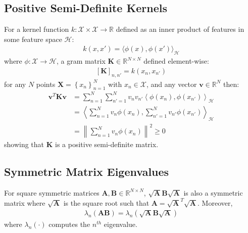 \documentclass{article}
\numberwithin{equation}{section}
\begin{document}
\subsection{Positive Semi-Definite Kernels} \label{appendix:positive-definite-kernel}
For a kernel function $k: \mathcal{X} \times \mathcal{X} \rightarrow \mathbb{R}$ defined as an inner product of features in some feature space $\mathcal{H}$:
\begin{align}
    k(x, x') = \langle \phi(x), \phi(x') \rangle_{\mathcal{H}}
\end{align}
where $\phi: \mathcal{X} \rightarrow \mathcal{H}$, a gram matrix $\mathbf{K} \in \mathbb{R}^{N\times N}$ defined element-wise:
\begin{align}
    \left[\mathbf{K}\right]_{n, n'} = k(x_n, x_{n'})
\end{align}
for any $N$ points $\mathbf{X} = \left\{x_n\right\}_{n=1}^N$ with $x_n \in \mathcal{X}$, and any vector $\mathbf{v} \in \mathbb{R}^N$ then:
\begin{align}
    \mathbf{v}^T \mathbf{K} \mathbf{v} &= \sum_{n=1}^N\sum_{n'=1}^N v_n v_{n'}  \left\langle \phi(x_n), \phi(x_{n'}) \right\rangle_{\mathcal{H}} \\
    &= \left\langle\sum_{n=1}^N v_n \phi(x_n), \sum_{n'=1}^N  v_{n'}\phi(x_{n'}) \right\rangle_{\mathcal{H}} \\
    &= \left\| \sum_{n=1}^N v_n \phi(x_n) \right\|^2 \geq 0
\end{align}
showing that $\mathbf{K}$ is a positive semi-definite matrix.

\newpage
\subsection{Symmetric Matrix Eigenvalues}\label{appendix:eigenvalue-symmetric-matrix}
For square symmetric matrices $\mathbf{A}, \mathbf{B} \in \mathbb{R}^{N \times N}$, $\sqrt{\mathbf{A}}\mathbf{B}\sqrt{\mathbf{A}}$ is also a symmetric matrix where $\sqrt{\mathbf{A}}$ is the square root such that $\mathbf{A} = \sqrt{\mathbf{A}}^T \sqrt{\mathbf{A}}$. Moreover,
\begin{align}
    \lambda_{n} \left(\mathbf{A} \mathbf{B}\right) = \lambda_{n} \left(\sqrt{\mathbf{A}}\mathbf{B}\sqrt{\mathbf{A}}\right) 
\end{align}
where $\lambda_{n}(\cdot)$ computes the $n^{th}$ eigenvalue.

\newpage
\end{document}
